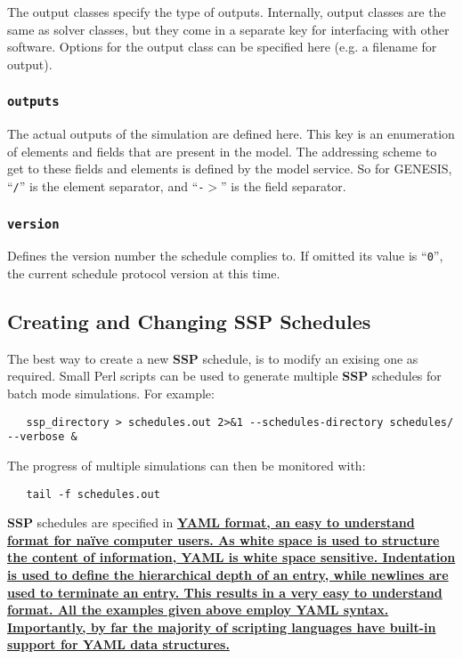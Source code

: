\documentclass[12pt]{article}
\begin{document}
The output classes specify the type of outputs. Internally, output classes are the same as solver classes, but they come in a separate key for interfacing with other software. Options for the output class can be specified here (e.g. a filename for output). 

\subsubsection*{\tt outputs}

The actual outputs of the simulation are defined here. This key is an enumeration of elements and fields that are present in the model. The addressing scheme to get to these fields and elements is defined by the model service. So for GENESIS, ``{\tt /}'' is the element separator, and ``{\tt -$>$}'' is the field separator. 

\subsubsection*{\tt version}

Defines the version number the schedule complies to. If omitted its value is ``{\tt 0}'', the current schedule protocol version at this time. 

\subsection*{Creating and Changing SSP Schedules}

The best way to create a new {\bf SSP} schedule, is to modify an exising one as required. Small Perl scripts can be used to generate multiple {\bf SSP} schedules for batch mode simulations. For example:

\begin{verbatim}
   ssp_directory > schedules.out 2>&1 --schedules-directory schedules/ --verbose &
\end{verbatim}
The progress of multiple simulations can then be monitored with:

\begin{verbatim}
   tail -f schedules.out
\end{verbatim}
{\bf SSP} schedules are specified in \href{http://www.yaml.org/}\bf {YAML} format, an easy to understand format for na\"{i}ve computer users. As white space is  used to structure the content of information, YAML is white space sensitive. Indentation is used to define the hierarchical depth of an entry, while newlines are used to terminate an entry. This results in a very easy to understand format. All the examples given above employ YAML syntax. Importantly, by far the majority of scripting languages have built-in support for YAML data structures. 
\end{document}

